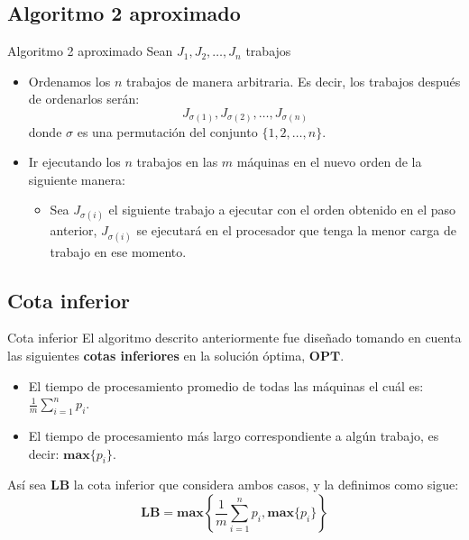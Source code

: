 \renewcommand{\subsectiontitle}{Algoritmo 2 aproximado}
\subsection{\subsectiontitle}

\begin{frame}{\subsectiontitle}
    Sean \(J_{1}, J_{2}, \dotsc, J_{n}\) trabajos
    \begin{itemize}
        \item Ordenamos los \(n\) trabajos de manera arbitraria. Es decir, los trabajos después de ordenarlos serán:
        \[
            J_{\sigma\left(1\right)}, J_{\sigma\left(2\right)}, \dotsc, J_{\sigma\left(n\right)}
        \]
        donde \(\sigma\) es una permutación del conjunto \(\{1, 2, \dotsc, n\}\).
        \item Ir ejecutando los \(n\) trabajos en las \(m\) máquinas en el nuevo orden de la siguiente manera:
        \begin{itemize}
            \item Sea \(J_{\sigma\left(i\right)}\) el siguiente trabajo a ejecutar con el orden obtenido en el paso anterior,
            \(J_{\sigma\left(i\right)}\) se ejecutará en el procesador que tenga la menor carga de trabajo en ese momento.
        \end{itemize}
    \end{itemize}
\end{frame}

\renewcommand{\subsectiontitle}{Cota inferior}
\subsection{\subsectiontitle}

\begin{frame}{\subsectiontitle}
    El algoritmo descrito anteriormente fue diseñado tomando en cuenta las siguientes \textbf{cotas inferiores} en la 
    solución óptima, \(\mathbf{OPT}\).
    \begin{itemize}
        \item El tiempo de procesamiento promedio de todas las máquinas el cuál es: \(\frac{1}{m}\displaystyle\sum_{i=1}^{n}p_{i}\).
        \item El tiempo de procesamiento más largo correspondiente a algún trabajo, es decir: \(\mathbf{max}\{p_{i}\}\).
    \end{itemize}
    Así sea \(\mathbf{LB}\) la cota inferior que considera ambos casos, y la definimos como sigue:
    \[
        \mathbf{LB} = \mathbf{max}\left \{ \frac{1}{m}\displaystyle\sum_{i=1}^{n}p_{i}, \mathbf{max}\{p_{i}\} \right \}
    \]
\end{frame}

